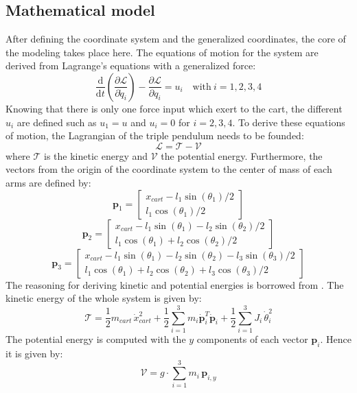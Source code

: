 \documentclass[a4paper,12pt,twoside]{article}
\begin{document}
\subsection{Mathematical model}
After defining the coordinate system and the generalized coordinates, the core of the modeling takes place here. The equations of motion for the system are derived from Lagrange's equations with a generalized force:
\begin{equation} \label{equ:Lagrange_motions}
	\frac{\text{d}}{\text{d}t} \left(\frac{\partial \mathcal{L}}{\partial \dot q_i}\right) - \frac{\partial \mathcal{L}}{\partial q_i} = u_i
	\quad \text{with}\ i=1,2,3,4
\end{equation}
Knowing that there is only one force input which exert to the cart, the different $u_i$ are defined such as $u_1 = u$ and $u_i = 0$ for $i=2,3,4$. To derive these equations of motion, the Lagrangian of the triple pendulum needs to be founded:
\begin{equation}
	\mathcal{L} = \mathcal{T} - \mathcal{V}
\end{equation}
where $\mathcal{T}$ is the kinetic energy and $\mathcal{V}$ the potential energy. Furthermore, the vectors from the origin of the coordinate system to the center of mass of each arms are defined by:
\[
	\mathbf{p}_1 =
	\begin{bmatrix}
		x_{cart} - l_1 \sin(\theta_1)/2 \\
		l_1 \cos(\theta_1)/2
	\end{bmatrix}
\]
\[
	\mathbf{p}_2 =
	\begin{bmatrix}
		x_{cart} - l_1 \sin(\theta_1) - l_2 \sin(\theta_2)/2 \\
		l_1 \cos(\theta_1) + l_2 \cos(\theta_2)/2
	\end{bmatrix}
\]
\[
	\mathbf{p}_3 =
	\begin{bmatrix}
		x_{cart} - l_1 \sin(\theta_1) - l_2 \sin(\theta_2) - l_3 \sin(\theta_3)/2 \\
		l_1 \cos(\theta_1) + l_2 \cos(\theta_2) + l_3 \cos(\theta_3)/2
	\end{bmatrix}
\]
The reasoning for deriving kinetic and potential energies is borrowed from \cite{}. The kinetic energy of the whole system is given by:
\begin{equation}
	\mathcal{T} = \frac{1}{2} m_{cart}\, \dot x_{cart}^2 + 
		\frac{1}{2} \sum_{i=1}^{3} m_i \mathbf{\dot p}_i^T \mathbf{\dot p}_i + 
		\frac{1}{2} \sum_{i=1}^{3} J_i\, \dot\theta_i^2
\end{equation}
The potential energy is computed with the $y$ components of each vector $\mathbf{p}_i$. Hence it is given by:
\begin{equation}
	\mathcal{V} = g \cdot \sum_{i=1}^3 m_i\, \mathbf{p}_{i,y}
\end{equation}
\end{document}
